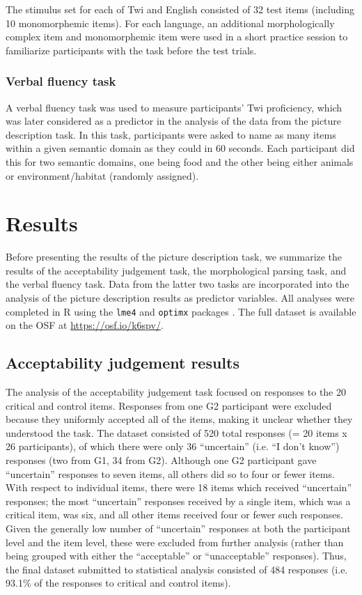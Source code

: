 \documentclass[output=paper,colorlinks,citecolor=brown]{langscibook}
\begin{document}
The stimulus set for each of Twi and English consisted of 32 test items (including 10 monomorphemic items). For each language, an additional morphologically complex item and monomorphemic item were used in a short practice session to familiarize participants with the task before the test trials. 

\subsubsection{Verbal fluency task}
\label{VFTSec}

A verbal fluency task was used to measure participants' Twi proficiency, which was later considered as a predictor in the analysis of the data from the picture description task. In this task, participants were asked to name as many items within a given semantic domain as they could in 60 seconds. Each participant did this for two semantic domains, one being food and the other being either animals or environment/habitat (randomly assigned). 

\section{Results}
\label{ResultsSec}

Before presenting the results of the picture description task, we summarize the results of the acceptability judgement task, the morphological parsing task, and the verbal fluency task. Data from the latter two tasks are incorporated into the analysis of the picture description results as predictor variables. All analyses were completed in R \citep{RProgram} using the \texttt{lme4} and \texttt{optimx} packages \citep{NashVaradhan2011, Nash2014, BatesMaechlerBolkerWalker2015}. The full dataset is available on the OSF at \url{https://osf.io/k6spv/}.

\subsection{Acceptability judgement results}
\label{AJTResultsSec}

The analysis of the acceptability judgement task focused on responses to the 20 critical and control items. Responses from one G2 participant were excluded because they uniformly accepted all of the items, making it unclear whether they understood the task. The dataset consisted of 520 total responses (= 20 items x 26 participants), of which there were only 36 “uncertain” (i.e. “I don't know”) responses (two from G1, 34 from G2). Although one G2 participant gave “uncertain” responses to seven items, all others did so to four or fewer items. With respect to individual items, there were 18 items which received “uncertain” responses; the most “uncertain” responses received by a single item, which was a critical item, was six, and all other items received four or fewer such responses. Given the generally low number of “uncertain” responses at both the participant level and the item level, these were excluded from further analysis (rather than being grouped with either the “acceptable” or “unacceptable” responses). Thus, the final dataset submitted to statistical analysis consisted of 484 responses (i.e. 93.1\% of the responses to critical and control items).
\end{document}
